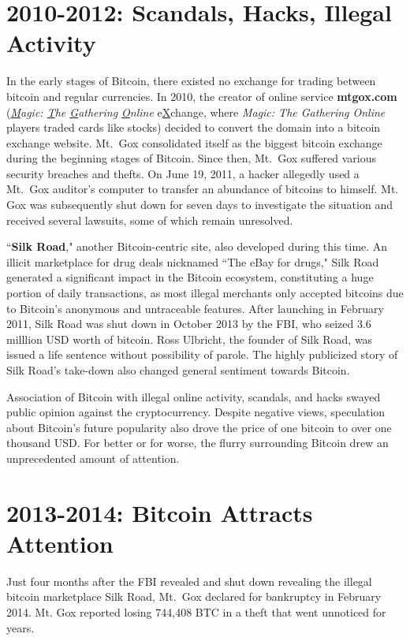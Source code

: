 \documentclass[full.tex]{subfiles}
\begin{document}
    \section*{2010-2012: Scandals, Hacks, Illegal Activity}
    In the early stages of Bitcoin, there existed no exchange for trading between bitcoin and regular currencies. In 2010, the creator of online service \textbf{mtgox.com} (\textit{\underline{M}agic: \underline{T}he 
    \underline{G}athering \underline{O}nline} e\underline{X}change, where \emph{Magic: The Gathering Online} players traded cards like stocks) decided to convert the domain into a bitcoin exchange website. Mt.\ Gox consolidated itself as the biggest bitcoin exchange during the beginning stages of Bitcoin. Since then, Mt.\ Gox suffered various security breaches and thefts. On June 19, 2011, a hacker allegedly used a Mt.\ Gox auditor's computer to transfer an abundance of bitcoins to himself. Mt. Gox was subsequently shut down for seven days to investigate the situation and received several lawsuits, some of which remain unresolved.
    
    ``\textbf{Silk Road}," another Bitcoin-centric site, also developed during this time. An illicit marketplace for drug deals nicknamed ``The eBay for drugs," Silk Road generated a significant impact in the Bitcoin ecosystem, constituting a huge portion of daily transactions, as most illegal merchants only accepted bitcoins due to Bitcoin's anonymous and untraceable features. After launching in February 2011, Silk Road was shut down in October 2013 by the FBI, who seized 3.6 milllion USD worth of bitcoin. Ross Ulbricht, the founder of Silk Road, was issued a life sentence without possibility of parole. The highly publicized story of Silk Road's take-down also changed general sentiment towards Bitcoin.
    
    Association of Bitcoin with illegal online activity, scandals, and hacks swayed public opinion against the cryptocurrency. Despite negative views, speculation about Bitcoin's future popularity also drove the price of one bitcoin to over one thousand USD. For better or for worse, the flurry surrounding Bitcoin drew an unprecedented amount of attention.
    \section*{2013-2014: Bitcoin Attracts Attention}
    
    Just four months after the FBI revealed and shut down revealing the illegal bitcoin marketplace Silk Road, Mt.\ Gox declared for bankruptcy in February 2014. Mt. Gox reported losing 744,408 BTC in a theft that went unnoticed for years.
    
\end{document}
